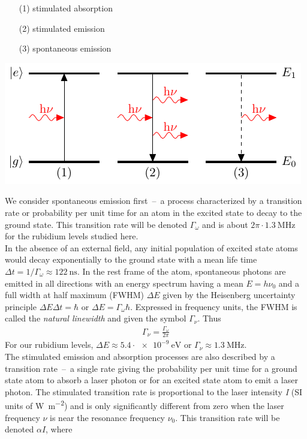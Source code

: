 \begin{minipage}[c][][c]{.35\textwidth}
\begin{itemize}
\item[(1)] stimulated absorption
\item[(2)] stimulated emission
\item[(3)] spontaneous emission
\end{itemize}
\end{minipage}
\hfill
\begin{minipage}[c]{.55\textwidth}
\includegraphics[width=\textwidth]{twolevel}
\end{minipage}
\bigskip

We consider spontaneous emission first~--~a process characterized by a transition rate or probability
per unit time for an atom in the excited state to decay to the ground state. This transition rate will 
be denoted \(\Gamma_\omega \) and is about \(2\pi\cdot \SI{1.3}{\mega\hertz} \) for the rubidium levels
studied here. \\
In the absence of an external field, any initial population of excited state atoms would decay exponentially
to the ground state with a mean life time \(\Delta t = 1/\Gamma_\omega \approx \SI{122}{\nano\second} \).
In the rest frame of the atom, spontaneous photons are emitted in all directions with an energy spectrum
having a mean \(E=h\nu_0 \) and a full width at half maximum (FWHM) \(\Delta E \) given by the
Heisenberg uncertainty principle \(\Delta E \Delta t = \hbar \) or \(\Delta E = \Gamma_\omega\hbar \).
Expressed in frequency units, the FWHM is called the \textit{natural linewidth} and given the symbol
\(\Gamma_\nu \). Thus
\begin{align}\label{eq:gamma_relation}
    \Gamma_\nu = \frac{\Gamma_\omega}{2\pi}
\end{align}
For our rubidium levels, \(\Delta E \approx 5.4\cdot \SI{e-9}{\electronvolt} \) or \(\Gamma_\nu\approx \SI{1.3}{\mega\hertz} \). \\ 
The stimulated emission and absorption processes are also described by a transition rate~--~a single rate
giving the probability per unit time for a ground state atom to absorb a laser photon or for an excited
state atom to emit a laser photon. The stimulated transition rate is proportional to the laser intensity
\textit{I} (SI units of \si{\watt\per\meter\squared}) and is only significantly different from zero when
the laser frequency \(\nu \) is near the resonance frequency \(\nu_0 \). This transition rate will be denoted
\(\alpha I \), where 

